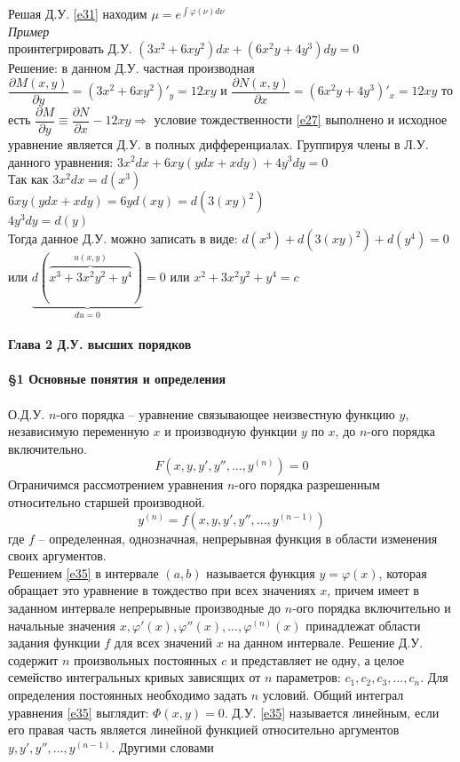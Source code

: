 \documentclass{article}
\numberwithin{equation}{section}
\begin{document}
Решая Д.У. \eqref{e31} находим $\mu=e^{\int\varphi(\nu) d\nu}$\\
\textit{Пример}\\
проинтегрировать Д.У. $(3x^2+6xy^2)dx+(6x^2y+4y^3)dy=0$\\
Решение: в данном Д.У. частная производная $\dfrac{\partial M(x,y)}{\partial y}=(3x^2+6xy^2)'_y=12xy$ и $\dfrac{\partial N(x,y)}{\partial x}=(6x^2y+4y^3)'_x=12xy$ то есть $\dfrac{\partial M}{\partial y}\equiv\dfrac{\partial N}{\partial x}-12xy\Rightarrow$ условие тождественности \eqref{e27} выполнено и исходное уравнение является Д.У. в полных дифференциалах. Группируя члены в Л.У. данного уравнения: $3x^2dx+6xy(ydx+xdy)+4y^3dy=0$\\
Так как $3x^2dx=d(x^3)$\\
$6xy(ydx+xdy)=6yd(xy)=d(3(xy)^2)$\\
$4y^3dy=d(y)$\\
Тогда данное Д.У. можно записать в виде: $d(x^3)+d(3(xy)^2)+d(y^4)=0$ или $\underbrace{d(\overbrace{x^3+3x^2y^2+y^4}^{u(x,y)})}_{du=0}=0$ или $x^2+3x^2y^2+y^4=c$
\\\\
\textbf{\Large{Глава 2 Д.У. высших порядков}}
\\\\
\textbf{\large{\S1 Основные понятия и определения}}
\\\\
О.Д.У. $n$-ого порядка -- уравнение связывающее неизвестную функцию $y$, независимую переменную $x$ и производную функции $y$ по $x$, до $n$-ого порядка включительно.
\begin{equation}\label{e34}
F(x,y,y',y'', ... , y^{(n)})=0
\end{equation}
Ограничимся рассмотрением уравнения $n$-ого порядка разрешенным относительно старшей производной.
\begin{equation}\label{e35}
y^{(n)}=f(x,y,y',y'',...,y^{(n-1)})
\end{equation}
где $f$ -- определенная, однозначная, непрерывная функция в области \colorbox{red!50}{изменения} своих аргументов.\\
Решением \eqref{e35} в интервале $(a,b)$ называется функция $y=\varphi(x)$, которая обращает это уравнение в тождество при всех значениях $x$, причем имеет в заданном интервале непрерывные производные до $n$-ого порядка включительно и начальные значения $x, \varphi'(x), \varphi''(x), ..., \varphi^{(n)}(x)$ принадлежат области задания функции $f$ для всех значений $x$ на данном интервале. Решение Д.У. содержит $n$ произвольных постоянных $c$ и представляет не одну, а целое семейство интегральных кривых зависящих от $n$ параметров: $c_1,c_2,c_3,...,c_n$. Для определения постоянных необходимо задать $n$ условий. Общий интеграл уравнения \eqref{e35} выглядит: $\Phi(x,y)=0$. Д.У. \eqref{e35} называется линейным, если его правая часть является линейной функцией относительно аргументов $y,y',y'',...,y^{(n-1)}$. Другими словами
\end{document}
